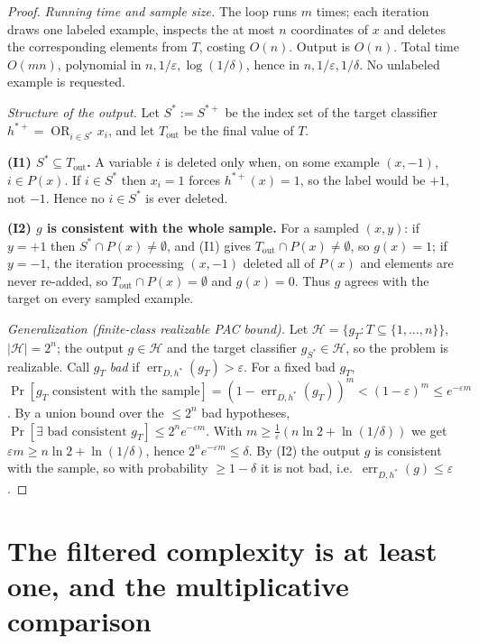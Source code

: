 \documentclass{amsart}
\theoremstyle{definition}
\DeclareMathOperator{\err}{err}
\DeclareMathOperator*{\OR}{OR}
\newcommand{\eps}{\varepsilon}
\begin{document}
\begin{proof}
\emph{Running time and sample size.} The loop runs $m$ times; each iteration
draws one labeled example, inspects the at most $n$ coordinates of $x$ and
deletes the corresponding elements from $T$, costing $O(n)$. Output is $O(n)$.
Total time $O(mn)$, polynomial in $n,1/\eps,\log(1/\delta)$, hence in
$n,1/\eps,1/\delta$. No unlabeled example is requested.

\emph{Structure of the output.} Let $S^\ast:=S^{\ast+}$ be the index set of the
target classifier $h^{\ast+}=\OR_{i\in S^\ast}x_i$, and let $T_{\mathrm{out}}$ be
the final value of $T$.

\textbf{(I1) $S^\ast\subseteq T_{\mathrm{out}}$.}
A variable $i$ is deleted only when, on some example $(x,-1)$, $i\in P(x)$. If
$i\in S^\ast$ then $x_i=1$ forces $h^{\ast+}(x)=1$, so the label would be $+1$,
not $-1$. Hence no $i\in S^\ast$ is ever deleted.

\textbf{(I2) $g$ is consistent with the whole sample.} For a sampled $(x,y)$:
if $y=+1$ then $S^\ast\cap P(x)\neq\emptyset$, and (I1) gives
$T_{\mathrm{out}}\cap P(x)\neq\emptyset$, so $g(x)=1$; if $y=-1$, the iteration
processing $(x,-1)$ deleted all of $P(x)$ and elements are never re-added, so
$T_{\mathrm{out}}\cap P(x)=\emptyset$ and $g(x)=0$. Thus $g$ agrees with the
target on every sampled example.

\emph{Generalization (finite-class realizable PAC bound).}
Let $\mathcal H=\{g_T:T\subseteq\{1,\dots,n\}\}$, $|\mathcal H|=2^n$; the output
$g\in\mathcal H$ and the target classifier $g_{S^\ast}\in\mathcal H$, so the
problem is realizable. Call $g_T$ \emph{bad} if $\err_{D,h^\ast}(g_T)>\eps$. For
a fixed bad $g_T$, $\Pr[g_T\text{ consistent with the sample}]
=(1-\err_{D,h^\ast}(g_T))^m<(1-\eps)^m\le e^{-\eps m}$. By a union bound over the
$\le2^n$ bad hypotheses,
$\Pr[\exists\text{ bad consistent }g_T]\le 2^n e^{-\eps m}$. With
$m\ge\frac1\eps(n\ln2+\ln(1/\delta))$ we get $\eps m\ge n\ln2+\ln(1/\delta)$,
hence $2^ne^{-\eps m}\le\delta$. By (I2) the output $g$ is consistent with the
sample, so with probability $\ge1-\delta$ it is not bad, i.e.\
$\err_{D,h^\ast}(g)\le\eps$.
\end{proof}

\section{The filtered complexity is at least one, and the multiplicative
comparison}\label{sec:lower}
\end{document}
